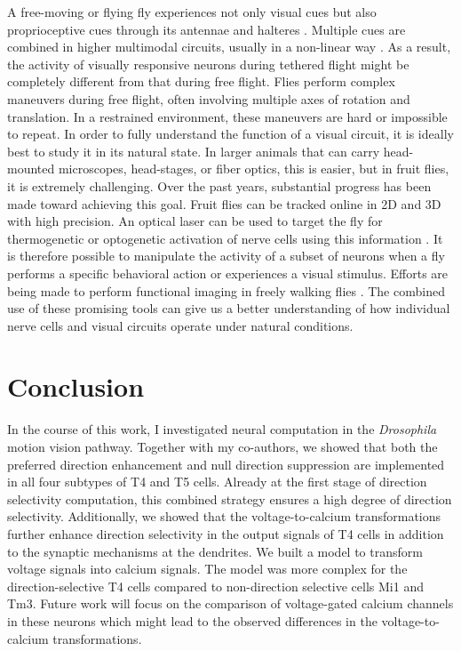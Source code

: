A free-moving or flying fly experiences not only visual cues but also proprioceptive cues through its antennae and halteres \parencite{Mamiya2011, Sandeman1980}. Multiple cues are combined in higher multimodal circuits, usually in a non-linear way \parencite{Haag2010, Huston2009}. As a result, the activity of visually responsive neurons during tethered flight might be completely different from that during free flight. Flies perform complex maneuvers during free flight, often involving multiple axes of rotation and translation. In a restrained environment, these maneuvers are hard or impossible to repeat. In order to fully understand the function of a visual circuit, it is ideally best to study it in its natural state. In larger animals that can carry head-mounted microscopes, head-stages, or fiber optics, this is easier, but in fruit flies, it is extremely challenging. Over the past years, substantial progress has been made toward achieving this goal. Fruit flies can be tracked online in 2D and 3D with high precision. An optical laser can be used to target the fly for thermogenetic or optogenetic activation of nerve cells using this information \parencite{Bath2014, Stowers2014, Straw2011}. It is therefore possible to manipulate the activity of a subset of neurons when a fly performs a specific behavioral action or experiences a visual stimulus. Efforts are being made to perform functional imaging in freely walking flies \parencite{Grover2016}. The combined use of these promising tools can give us a better understanding of how individual nerve cells and visual circuits operate under natural conditions.

\section{Conclusion}
In the course of this work, I investigated neural computation in the \textit{Drosophila} motion vision pathway. Together with my co-authors, we showed that both the preferred direction enhancement and null direction suppression are implemented in all four subtypes of T4 and T5 cells. Already at the first stage of direction selectivity computation, this combined strategy ensures a high degree of direction selectivity. Additionally, we showed that the voltage-to-calcium transformations further enhance direction selectivity in the output signals of T4 cells in addition to the synaptic mechanisms at the dendrites. We built a model to transform voltage signals into calcium signals. The model was more complex for the direction-selective T4 cells compared to non-direction selective cells Mi1 and Tm3. Future work will focus on the comparison of voltage-gated calcium channels in these neurons which might lead to the observed differences in the voltage-to-calcium transformations.



